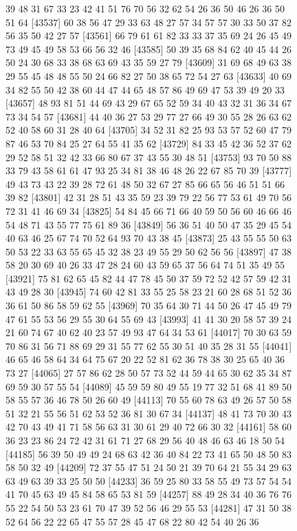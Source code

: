 \documentclass{article}
\begin{document}
\begin{figure}[H]
\begin{Schunk}
\begin{Soutput}
[43513] 39 48 31 67 33 23 42 41 51 76 70 56 32 62 54 26 36 50 46 26 36 50 51 64
[43537] 60 38 56 47 29 33 63 48 27 57 34 57 57 30 33 50 37 82 56 35 50 42 27 57
[43561] 66 79 61 61 82 33 33 37 35 69 24 26 45 49 73 49 45 49 58 53 66 56 32 46
[43585] 50 39 35 68 84 62 40 45 44 26 50 24 30 68 33 38 68 63 69 43 35 59 27 79
[43609] 31 69 68 49 63 38 29 55 45 48 48 55 50 24 66 82 27 50 38 65 72 54 27 63
[43633] 40 69 34 82 55 50 42 38 60 44 47 44 65 48 57 86 49 69 47 53 39 49 20 33
[43657] 48 93 81 51 44 69 43 29 67 65 52 59 34 40 43 32 31 36 34 67 73 34 54 57
[43681] 44 40 36 27 53 29 77 27 66 49 30 55 28 26 63 62 52 40 58 60 31 28 40 64
[43705] 34 52 31 82 25 93 53 57 52 60 47 79 87 46 53 70 84 25 27 64 55 41 35 62
[43729] 84 33 45 42 36 52 37 62 29 52 58 51 32 42 33 66 80 67 37 43 55 30 48 51
[43753] 93 70 50 88 33 79 43 58 61 61 47 93 25 34 81 38 46 48 26 22 67 85 70 39
[43777] 49 43 73 43 22 39 28 72 61 48 50 32 67 27 85 66 65 56 46 51 51 66 39 82
[43801] 42 31 28 51 43 35 59 23 39 79 22 56 77 53 61 49 70 56 72 31 41 46 69 34
[43825] 54 84 45 66 71 66 40 59 50 56 60 46 66 46 54 48 71 43 55 77 75 61 89 36
[43849] 56 36 51 40 50 47 35 29 45 54 40 63 46 25 67 74 70 52 64 93 70 43 38 45
[43873] 25 43 55 55 50 63 50 53 22 33 63 55 65 45 32 38 23 49 55 29 50 62 56 56
[43897] 47 38 58 20 30 69 40 26 33 47 28 24 60 43 59 65 37 56 64 74 51 35 49 55
[43921] 75 81 62 65 45 82 44 47 78 45 50 37 59 72 52 42 57 59 42 31 43 49 28 30
[43945] 74 60 42 81 33 55 25 58 23 21 60 28 68 51 52 36 36 61 50 86 58 59 62 55
[43969] 70 35 64 30 71 44 50 26 47 45 49 79 47 61 55 53 56 29 55 30 64 55 69 43
[43993] 41 41 30 20 58 57 39 24 21 60 74 67 40 62 40 23 57 49 93 47 64 34 53 61
[44017] 70 30 63 59 70 86 31 56 71 88 69 29 31 55 77 62 55 30 51 40 35 28 31 55
[44041] 46 65 46 58 64 34 64 75 67 20 22 52 81 62 36 78 38 30 25 65 40 36 73 27
[44065] 27 57 86 62 28 50 57 73 52 44 59 44 65 30 62 35 34 87 69 59 30 57 55 54
[44089] 45 59 59 80 49 55 19 77 32 51 68 41 89 50 58 55 57 36 46 78 50 26 60 49
[44113] 70 55 60 78 63 49 26 57 50 58 51 32 21 55 56 51 62 53 52 36 81 30 67 34
[44137] 48 41 73 70 30 43 42 70 43 49 41 71 58 56 63 31 30 61 29 40 72 66 30 32
[44161] 58 60 36 23 23 86 24 72 42 31 61 71 27 68 29 56 40 48 46 63 46 18 50 54
[44185] 56 39 50 49 49 24 68 63 42 36 40 84 22 73 41 65 50 48 50 83 58 50 32 49
[44209] 72 37 55 47 51 24 50 21 39 70 64 21 55 34 29 63 63 49 63 39 33 25 50 50
[44233] 36 59 25 80 33 58 55 49 73 57 54 54 41 70 45 63 49 45 84 58 65 53 81 59
[44257] 88 49 28 34 40 36 76 76 55 22 54 50 53 23 61 70 47 39 52 56 46 29 55 53
[44281] 47 31 50 38 52 64 56 22 22 65 47 55 57 28 45 47 68 22 80 42 54 40 26 36

\end{Soutput}
\end{Schunk}
\end{figure}
\end{document}
